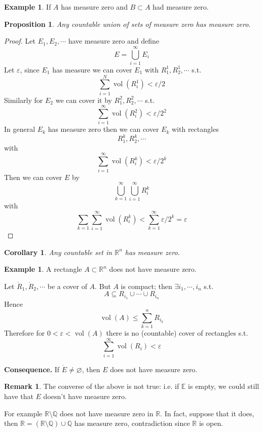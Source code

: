 \documentclass[11pt,a4paper]{article}
\theoremstyle{definition}
\newtheorem{example}[definition]{Example}
\newtheorem{remark}[definition]{Remark}
\theoremstyle{plain}
\newtheorem{proposition}[definition]{Proposition}
\newtheorem{corollary}[definition]{Corollary}
\theoremstyle{remark}
\newcommand{\R}{\mathbb{R}}
\newcommand{\Q}{\mathbb{Q}}
\newcommand{\vol}{\operatorname{vol}}
\begin{document}
\begin{example}
    If $A$ has measure zero and $B \subset A$ had measure zero.
\end{example}

\begin{proposition}
    Any countable union of sets of measure zero has measure zero.
\end{proposition}

\begin{proof}
    Let $E_1, E_2, \cdots$ have measure zero and define 
    $$ E= \bigcup_{i=1}^\infty E_i$$
    Let $\varepsilon$, since $E_1$ has measure we can cover $E_1$ with 
    $R_1^1, R_2^1, \cdots$ s.t. 
    $$\sum_{i=1}^N \vol (R_i^1) < \varepsilon/2$$
    Similarly for $E_2$ we can cover it by $R_1^2, R_2^2, \cdots$ s.t. 
    $$\sum_{i=1}^\infty \vol (R_i^2) < \varepsilon/2^2$$
    In general $E_k$ has measure zero then we can cover $E_k$ with rectangles 
    $$R_1^k, R_2^k, \cdots$$
    with 
    $$\sum_{i=1}^\infty \vol (R_i^k) < \varepsilon/2^k$$
    Then we can cover $E$ by 
    $$\bigcup_{k=1}^\infty \bigcup_{i=1}^\infty R_i^k$$
    with 
    $$\sum_{k=1} \sum_{i=1}^\infty \vol (R_i^k) < \sum_{k=1}^\infty \varepsilon/2^k = \varepsilon$$
\end{proof}

\begin{corollary}
    Any countable set in $\R^n$ has measure zero. 
\end{corollary}

\begin{example}
    A rectangle $A \subset \R^n$ does not have measure zero. 

    Let $\mathring{R}_1, \mathring{R}_2, \cdots$ be a cover of $A$. But $A$ is compact; 
    then $\exists i_1, \cdots, i_n$ s.t. 
    $$A \subseteq R_{i_1} \cup \cdots \cup R_{i_n} $$
    Hence 
    $$\vol (A) \le \sum_{k=1}^n R_{i_k}$$
    Therefore for $0 < \varepsilon < \vol (A)$ there is no (countable) cover of rectangles 
    s.t. 
    $$\sum_{i=1}^\infty \vol (R_i) < \varepsilon$$

    \textbf{Consequence.} If $\mathring{E} \ne \varnothing$, then $E$ does not have measure zero.  
\end{example}

\begin{remark}
    The converse of the above is not true: i.e. if $\mathbb{E}$ is empty, we could still have that $E$ doesn't have measure 
    zero.

    For example $\R \setminus \Q$ does not have measure zero in $\R$. In fact, suppose that it does, then 
    $\R = (\R \setminus \Q) \cup \Q$ has measure zero, contradiction since $\R$ is open.  
\end{remark}
\end{document}
